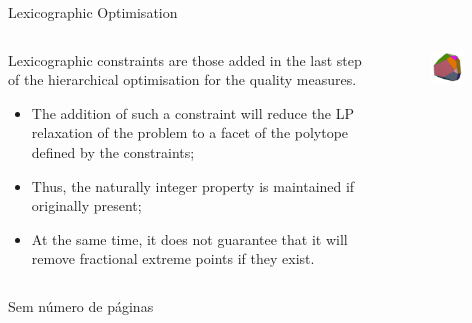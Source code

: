 \documentclass{beamer}
\begin{document}
\begin{frame}{Lexicographic Optimisation}
  \begin{columns}[c]
      \begin{column}{.66\textwidth}
	Lexicographic constraints are those added in the last step of the hierarchical optimisation for the quality measures. 
	\begin{itemize}
	    \item The addition of such a constraint will reduce the LP relaxation of the problem to a facet of the polytope defined by the constraints;
	    \item Thus, the naturally integer property is maintained if originally present;
	    \item At the same time, it does not guarantee that it will remove fractional extreme points if they exist.
	\end{itemize}
      \end{column}
      \begin{column}{.33\textwidth}
	  \begin{figure}[h]
	      \centering
	      \includegraphics[width=0.8\textwidth]{polytope.png}
	  \end{figure}
      \end{column}
  \end{columns}
\end{frame}
\begin{frame}[plain]{Sem número de páginas}
\lipsum[1]
\end{frame}
\end{document}
